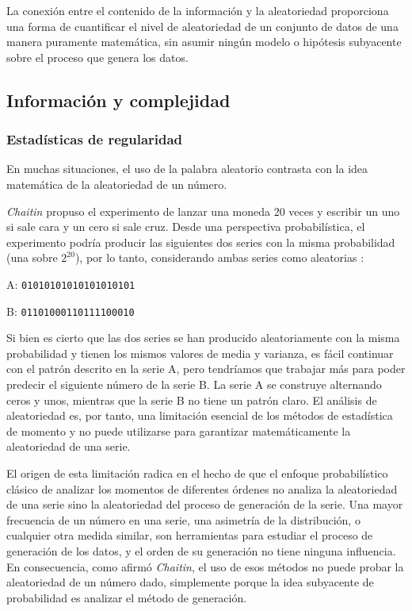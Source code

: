 \documentclass[a4paper,12pt]{article}
\begin{document}
La conexión entre el contenido de la información y la aleatoriedad proporciona una forma de cuantificar el nivel de aleatoriedad de un conjunto de datos de una manera puramente matemática, sin asumir ningún modelo o hipótesis subyacente sobre el proceso que genera los datos. 

\subsection{Información y complejidad}
\subsubsection{Estadísticas de regularidad} 
En muchas situaciones, el uso de la palabra aleatorio contrasta con la idea matemática de la aleatoriedad de un número. 

\textit{Chaitin} \citep{chaitin} propuso el experimento de lanzar una moneda 20 veces y escribir un uno si sale cara y un cero si sale cruz. Desde una perspectiva probabilística, el experimento podría producir las siguientes dos series con la misma probabilidad (una sobre $2^{20}$), por lo tanto, considerando ambas series como aleatorias : 

A: \texttt{01010101010101010101}

B: \texttt{01101000110111100010}

Si bien es cierto que las dos series se han producido aleatoriamente con la misma probabilidad y tienen los mismos valores de media y varianza, es fácil continuar con el patrón descrito en la serie A, pero tendríamos que trabajar más para poder predecir el siguiente número de la serie B. La serie A se construye alternando ceros y unos, mientras que la serie B no tiene un patrón claro. El análisis de aleatoriedad es, por tanto, una limitación esencial de los métodos de estadística de momento y no puede utilizarse para garantizar matemáticamente la aleatoriedad de una serie.

El origen de esta limitación radica en el hecho de que el enfoque probabilístico clásico de analizar los momentos de diferentes órdenes no analiza la aleatoriedad de una serie sino la aleatoriedad del proceso de generación de la serie. Una mayor frecuencia de un número en una serie, una asimetría de la distribución, o cualquier otra medida similar, son herramientas para estudiar el proceso de generación de los datos, y el orden de su generación no tiene ninguna influencia. En consecuencia, como afirmó \textit{Chaitin}, el uso de esos métodos no puede probar la aleatoriedad de un número dado, simplemente porque la idea subyacente de probabilidad es analizar el método de generación. 
\end{document}
